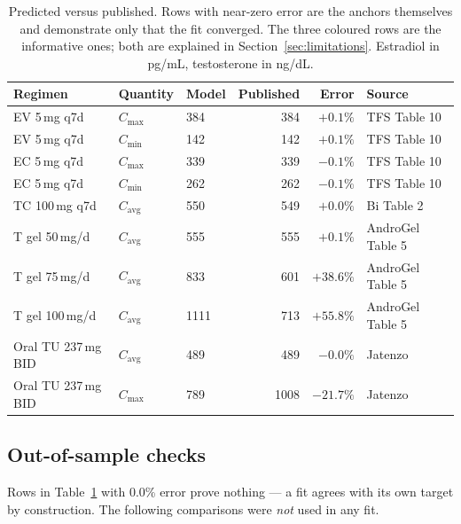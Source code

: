 \documentclass[11pt,a4paper]{article}
\newcommand{\bad}[1]{\textcolor{warn}{#1}}
\newcommand{\good}[1]{\textcolor{ok}{#1}}
\begin{document}
\begin{table}[h]
\centering
\small
\begin{tabular}{@{}lllrrl@{}}
\toprule
\textbf{Regimen} & \textbf{Quantity} & \textbf{Model} & \textbf{Published}
                 & \textbf{Error} & \textbf{Source} \\
\midrule
EV 5\,mg q7d & $C_{\max}$ & 384 & 384 & \good{$+0.1\%$} & TFS Table 10 \\
EV 5\,mg q7d & $C_{\min}$ & 142 & 142 & \good{$+0.1\%$} & TFS Table 10 \\
EC 5\,mg q7d & $C_{\max}$ & 339 & 339 & \good{$-0.1\%$} & TFS Table 10 \\
EC 5\,mg q7d & $C_{\min}$ & 262 & 262 & \good{$-0.1\%$} & TFS Table 10 \\
TC 100\,mg q7d & $C_{\mathrm{avg}}$ & 550 & 549 & \good{$+0.0\%$} & Bi Table 2 \\
T gel 50\,mg/d & $C_{\mathrm{avg}}$ & 555 & 555 & \good{$+0.1\%$} & AndroGel Table 5 \\
T gel 75\,mg/d & $C_{\mathrm{avg}}$ & 833 & 601 & \bad{$+38.6\%$} & AndroGel Table 5 \\
T gel 100\,mg/d & $C_{\mathrm{avg}}$ & 1111 & 713 & \bad{$+55.8\%$} & AndroGel Table 5 \\
Oral TU 237\,mg BID & $C_{\mathrm{avg}}$ & 489 & 489 & \good{$-0.0\%$} & Jatenzo \\
Oral TU 237\,mg BID & $C_{\max}$ & 789 & 1008 & \bad{$-21.7\%$} & Jatenzo \\
\bottomrule
\end{tabular}
\caption{Predicted versus published. Rows with near-zero error are the anchors
themselves and demonstrate only that the fit converged. The three coloured rows
are the informative ones; both are explained in Section~\ref{sec:limitations}.
Estradiol in pg/mL, testosterone in ng/dL.}
\label{tab:accuracy}
\end{table}

\subsection{Out-of-sample checks}

Rows in Table~\ref{tab:accuracy} with 0.0\% error prove nothing --- a fit agrees
with its own target by construction. The following comparisons were \emph{not}
used in any fit.
\end{document}
